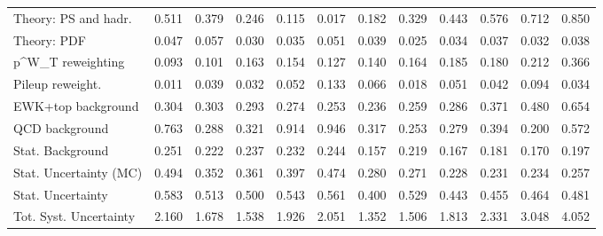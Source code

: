 \begin{tabular}{l|p{0.6cm}p{0.6cm}p{0.6cm}p{0.6cm}p{0.6cm}p{0.6cm}p{0.6cm}p{0.6cm}p{0.6cm}p{0.6cm}p{0.6cm}}
Theory: PS and hadr.                     & 0.511 & 0.379 & 0.246 & 0.115 & 0.017 & 0.182 & 0.329 & 0.443 & 0.576 & 0.712 & 0.850 \\
Theory: PDF                              & 0.047 & 0.057 & 0.030 & 0.035 & 0.051 & 0.039 & 0.025 & 0.034 & 0.037 & 0.032 & 0.038 \\
p^{W}_{T} reweighting                    & 0.093 & 0.101 & 0.163 & 0.154 & 0.127 & 0.140 & 0.164 & 0.185 & 0.180 & 0.212 & 0.366 \\
Pileup reweight.                         & 0.011 & 0.039 & 0.032 & 0.052 & 0.133 & 0.066 & 0.018 & 0.051 & 0.042 & 0.094 & 0.034 \\
EWK+top background                       & 0.304 & 0.303 & 0.293 & 0.274 & 0.253 & 0.236 & 0.259 & 0.286 & 0.371 & 0.480 & 0.654 \\
QCD background                           & 0.763 & 0.288 & 0.321 & 0.914 & 0.946 & 0.317 & 0.253 & 0.279 & 0.394 & 0.200 & 0.572 \\
Stat. Background                         & 0.251 & 0.222 & 0.237 & 0.232 & 0.244 & 0.157 & 0.219 & 0.167 & 0.181 & 0.170 & 0.197 \\
Stat. Uncertainty (MC)                   & 0.494 & 0.352 & 0.361 & 0.397 & 0.474 & 0.280 & 0.271 & 0.228 & 0.231 & 0.234 & 0.257 \\
\hline
Stat. Uncertainty                        & 0.583 & 0.513 & 0.500 & 0.543 & 0.561 & 0.400 & 0.529 & 0.443 & 0.455 & 0.464 & 0.481 \\
\hline
Tot. Syst. Uncertainty                   & 2.160 & 1.678 & 1.538 & 1.926 & 2.051 & 1.352 & 1.506 & 1.813 & 2.331 & 3.048 & 4.052 \\
\hline
\end{tabular}
